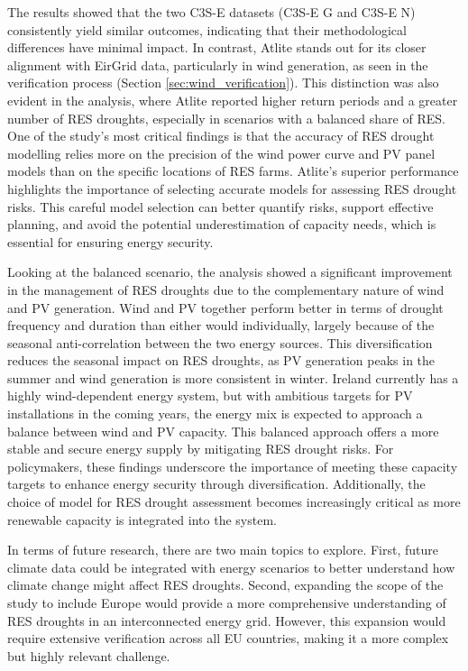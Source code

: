\documentclass[a4paper, 11pt]{article}
\begin{document}
The results showed that the two C3S-E datasets (C3S-E G and C3S-E N) consistently yield similar outcomes, indicating that their methodological differences have minimal impact. In contrast, Atlite stands out for its closer alignment with EirGrid data, particularly in wind generation, as seen in the verification process (Section \ref{sec:wind_verification}). This distinction was also evident in the analysis, where Atlite reported higher return periods and a greater number of RES droughts, especially in scenarios with a balanced share of RES. One of the study's most critical findings is that the accuracy of RES drought modelling relies more on the precision of the wind power curve and PV panel models than on the specific locations of RES farms. Atlite’s superior performance highlights the importance of selecting accurate models for assessing RES drought risks. This careful model selection can better quantify risks, support effective planning, and avoid the potential underestimation of capacity needs, which is essential for ensuring energy security.

Looking at the balanced scenario, the analysis showed a significant improvement in the management of RES droughts due to the complementary nature of wind and PV generation. Wind and PV together perform better in terms of drought frequency and duration than either would individually, largely because of the seasonal anti-correlation between the two energy sources. This diversification reduces the seasonal impact on RES droughts, as PV generation peaks in the summer and wind generation is more consistent in winter. Ireland currently has a highly wind-dependent energy system, but with ambitious targets for PV installations in the coming years, the energy mix is expected to approach a balance between wind and PV capacity. This balanced approach offers a more stable and secure energy supply by mitigating RES drought risks. For policymakers, these findings underscore the importance of meeting these capacity targets to enhance energy security through diversification. Additionally, the choice of model for RES drought assessment becomes increasingly critical as more renewable capacity is integrated into the system.

In terms of future research, there are two main topics to explore. First, future climate data could be integrated with energy scenarios to better understand how climate change might affect RES droughts. Second, expanding the scope of the study to include Europe would provide a more comprehensive understanding of RES droughts in an interconnected energy grid. However, this expansion would require extensive verification across all EU countries, making it a more complex but highly relevant challenge.
\end{document}
